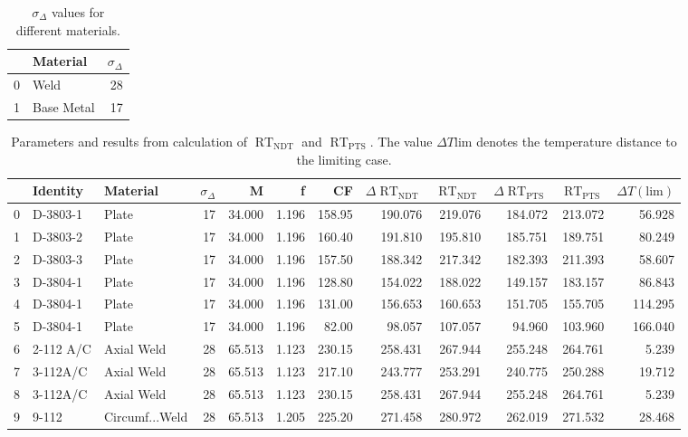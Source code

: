 \documentclass{article}
\begin{document}
    \begin{table}[htb]
    \caption{$\sigma_\Delta$ values for different materials.}
    \label{table:sigma_delta}
    \centering
    \begin{tabular}{llr}
    \toprule
    {} &    Material &  $\sigma_\Delta$ \\
    \midrule
    0 &        Weld &  28 \\
    1 &  Base Metal &  17 \\
    \bottomrule
    \end{tabular}
    \end{table}
    
    \begin{table}
    \caption{Parameters and results from calculation of $\operatorname{RT}_{\operatorname{NDT}}$ and $\operatorname{RT}_{\operatorname{PTS}}$. The value $\Delta T\text{lim}$ denotes the temperature distance to the limiting case.}
    \label{table:rt_values}
    
    \begin{tabular}{lllrrrrrrrrr}
        \toprule
        {} &                                  Identity &              Material &  $\sigma_\Delta$ &      M &    f &     CF &  $\Delta\operatorname{RT}_{\operatorname{NDT}}$ &  $\operatorname{RT}_{\operatorname{NDT}}$  & $\Delta\operatorname{RT}_{\operatorname{PTS}}$  &  $\operatorname{RT}_{\operatorname{PTS}}$ & $\Delta T(\text{lim})$ \\
       \midrule 
        0 &   D-3803-1 &           Plate &   17 & 34.000 & 1.196 & 158.95 &  190.076 & 219.076 &  184.072 & 213.072 &   56.928 \\
        1 &   D-3803-2 &           Plate &   17 & 34.000 & 1.196 & 160.40 &  191.810 & 195.810 &  185.751 & 189.751 &   80.249 \\
        2 &   D-3803-3 &           Plate &   17 & 34.000 & 1.196 & 157.50 &  188.342 & 217.342 &  182.393 & 211.393 &   58.607 \\
        3 &   D-3804-1 &           Plate &   17 & 34.000 & 1.196 & 128.80 &  154.022 & 188.022 &  149.157 & 183.157 &   86.843 \\
        4 &   D-3804-1 &           Plate &   17 & 34.000 & 1.196 & 131.00 &  156.653 & 160.653 &  151.705 & 155.705 &  114.295 \\
        5 &   D-3804-1 &           Plate &   17 & 34.000 & 1.196 &  82.00 &   98.057 & 107.057 &   94.960 & 103.960 &  166.040 \\
        6 &  2-112 A/C &      Axial Weld &   28 & 65.513 & 1.123 & 230.15 &  258.431 & 267.944 &  255.248 & 264.761 &    5.239 \\
        7 &   3-112A/C &      Axial Weld &   28 & 65.513 & 1.123 & 217.10 &  243.777 & 253.291 &  240.775 & 250.288 &   19.712 \\
        8 &   3-112A/C &      Axial Weld &   28 & 65.513 & 1.123 & 230.15 &  258.431 & 267.944 &  255.248 & 264.761 &    5.239 \\
        9 &      9-112 &  Circumf...Weld &   28 & 65.513 & 1.205 & 225.20 &  271.458 & 280.972 &  262.019 & 271.532 &   28.468 \\
        \bottomrule
        \end{tabular}
    \end{table}
    
\end{document}
